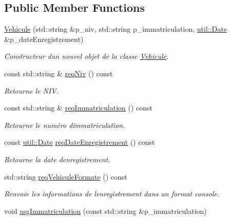 \subsection*{Public Member Functions}
\begin{DoxyCompactItemize}
\item 
\hyperlink{classsaaq_1_1Vehicule_a5484cacf87662d2d2e154632bb90cfca}{Vehicule} (std\+::string \&p\+\_\+niv, std\+::string p\+\_\+immatriculation, \hyperlink{classutil_1_1Date}{util\+::\+Date} \&p\+\_\+date\+Enregistrement)
\begin{DoxyCompactList}\small\item\em Constructeur d\textquotesingle{}un nouvel objet de la classe \hyperlink{classsaaq_1_1Vehicule}{Vehicule}. \end{DoxyCompactList}\item 
const std\+::string \& \hyperlink{classsaaq_1_1Vehicule_a8a7c31860afb58614a44ba89a9ddc224}{req\+Niv} () const
\begin{DoxyCompactList}\small\item\em Retourne le N\+IV. \end{DoxyCompactList}\item 
const std\+::string \& \hyperlink{classsaaq_1_1Vehicule_a2e8df437d34cc3b3e5008d5a5a819aae}{req\+Immatriculation} () const
\begin{DoxyCompactList}\small\item\em Retourne le numéro d\textquotesingle{}immatriculation. \end{DoxyCompactList}\item 
const \hyperlink{classutil_1_1Date}{util\+::\+Date} \hyperlink{classsaaq_1_1Vehicule_a650c5f764375e344e268391a5c3cf8b3}{req\+Date\+Enregistrement} () const
\begin{DoxyCompactList}\small\item\em Retourne la date d\textquotesingle{}enregistrement. \end{DoxyCompactList}\item 
std\+::string \hyperlink{classsaaq_1_1Vehicule_a9d0ff95273ecd7858cf9bd12aac359ba}{req\+Vehicule\+Formate} () const
\begin{DoxyCompactList}\small\item\em Renvoie les informations de l\textquotesingle{}enregistrement dans un format console. \end{DoxyCompactList}\item 
void \hyperlink{classsaaq_1_1Vehicule_a17c2ad3a6fabdf37c47811a9b0183e24}{asg\+Immatriculation} (const std\+::string \&p\+\_\+immatriculation)

\end{DoxyCompactItemize}
